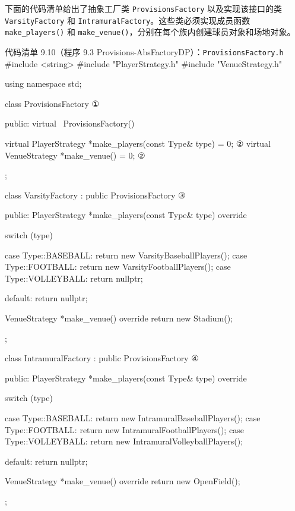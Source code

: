 
下面的代码清单给出了抽象工厂类 \texttt{Provisions\allowbreak{}Factory} 以及实现该接口的类 \texttt{Varsity\allowbreak{}Factory} 和 \texttt{Intramural\allowbreak{}Factory}。这些类必须实现成员函数 \texttt{make\_\allowbreak{}players(\allowbreak{})\allowbreak{}} 和 \texttt{make\_\allowbreak{}venue(\allowbreak{})\allowbreak{}}，分别在每个族内创建球员对象和场地对象。

\begin{codeboxt}{代码清单 9.10（程序 9.3 Provisions-AbsFactoryDP）：\texttt{Provisions\allowbreak{}Factory.\allowbreak{}h}}
#include <string>
#include "PlayerStrategy.h"
#include "VenueStrategy.h"

using namespace std;

class ProvisionsFactory                                         ①
{
public:
    virtual ~ProvisionsFactory() {}

    virtual PlayerStrategy *make_players(const Type& type) = 0; ②
    virtual VenueStrategy  *make_venue() = 0;                   ②
};

class VarsityFactory : public ProvisionsFactory                 ③
{
public:
    PlayerStrategy *make_players(const Type& type) override
    {
        switch (type)
        {
            case Type::BASEBALL:
                return new VarsityBaseballPlayers();
            case Type::FOOTBALL:
                return new VarsityFootballPlayers();
            case Type::VOLLEYBALL:
                return nullptr;

            default: return nullptr;
        }
    }

    VenueStrategy *make_venue() override
    {
        return new Stadium();
    }
};

class IntramuralFactory : public ProvisionsFactory              ④
{
public:
    PlayerStrategy *make_players(const Type& type) override
    {
        switch (type)
        {
            case Type::BASEBALL:
                return new IntramuralBaseballPlayers();
            case Type::FOOTBALL:
                return new IntramuralFootballPlayers();
            case Type::VOLLEYBALL:
                return new IntramuralVolleyballPlayers();

            default: return nullptr;
        }
    }

    VenueStrategy *make_venue() override
    {
        return new OpenField();
    }
};
\end{codeboxt}
\par
{}\par
{}\par
{}\par

